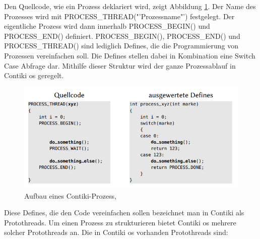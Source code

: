	Den Quellcode, wie ein Prozess deklariert wird, zeigt Abbildung \ref{ContikiProzess}. Der Name des Prozesses wird mit PROCESS\_THREAD("'Prozessname"') festgelegt. Der eigentliche Prozess wird dann innerhalb PROCESS\_BEGIN() und PROCESS\_END() definiert. PROCESS\_BEGIN(), PROCESS\_END() und PROCESS\_THREAD() sind lediglich Defines, die die Programmierung von Prozessen vereinfachen soll. Die Defines stellen dabei in Kombination eine Switch Case Abfrage dar. Mithilfe dieser Struktur wird der ganze Prozessablauf in Contiki \ac{os} geregelt.
	\begin{figure}
		\centering
		\includegraphics[scale=0.5]{Grafiken-Julian/Contiki_Prozess.png}
		\caption{Aufbau eines Contiki-Prozess, \cite[S.9]{ausgewertetedefines}}
		\label{ContikiProzess}
	\end{figure}
	Diese Defines, die den Code vereinfachen sollen bezeichnet man in Contiki als Protothreads. Um einen Prozess zu strukturieren bietet Contiki \ac{os} mehrere solcher Protothreads an. Die in Contiki \ac{os} vorhanden Protothreads sind:
	
